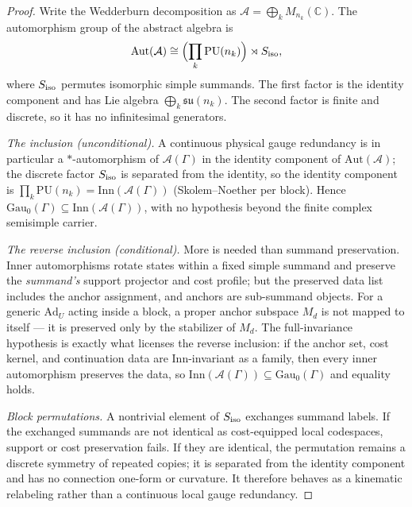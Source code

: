 \documentclass[11pt]{article}
\theoremstyle{definition}
\begin{document}
\begin{proof}
Write the Wedderburn decomposition as
$\mathcal A=\bigoplus_k M_{n_k}(\mathbb C)$.  The automorphism group of the
abstract algebra is
\[
  \mathrm{Aut}(\mathcal A)\cong
  \Bigl(\prod_k \mathrm{PU}(n_k)\Bigr)\rtimes S_{\rm iso},
\]
where $S_{\rm iso}$ permutes isomorphic simple summands.  The first factor is
the identity component and has Lie algebra $\bigoplus_k\mathfrak{su}(n_k)$.
The second factor is finite and discrete, so it has no infinitesimal
generators.

\textit{The inclusion (unconditional).}\quad
A continuous physical gauge redundancy is in particular a
$*$-automorphism of $\mathcal A(\Gamma)$ in the identity component of
$\mathrm{Aut}(\mathcal A)$; the discrete factor $S_{\rm iso}$ is
separated from the identity, so the identity component is
$\prod_k \mathrm{PU}(n_k) = \mathrm{Inn}(\mathcal A(\Gamma))$ (Skolem--Noether
per block).  Hence $\mathrm{Gau}_0(\Gamma) \subseteq
\mathrm{Inn}(\mathcal A(\Gamma))$, with no hypothesis beyond the
finite complex semisimple carrier.

\textit{The reverse inclusion (conditional).}\quad
More is needed than summand preservation.  Inner automorphisms rotate
states within a fixed simple summand and preserve the \emph{summand's}
support projector and cost profile; but the preserved data list
includes the anchor assignment, and anchors are sub-summand objects.
For a generic $\mathrm{Ad}_U$ acting inside a block, a proper anchor
subspace $M_d$ is not mapped to itself --- it is preserved only by the
stabilizer of $M_d$.  The full-invariance hypothesis is exactly what
licenses the reverse inclusion: if the anchor set, cost kernel, and
continuation data are $\mathrm{Inn}$-invariant as a family, then every
inner automorphism preserves the data, so
$\mathrm{Inn}(\mathcal A(\Gamma)) \subseteq \mathrm{Gau}_0(\Gamma)$ and
equality holds.

\textit{Block permutations.}\quad
A nontrivial element of $S_{\rm iso}$ exchanges summand labels.  If the
exchanged summands are not identical as cost-equipped local codespaces,
support or cost preservation fails.  If they are identical, the
permutation remains a discrete symmetry of repeated copies; it is
separated from the identity component and has no connection one-form or
curvature.  It therefore behaves as a kinematic relabeling rather than
a continuous local gauge redundancy.


\end{proof}
\end{document}

